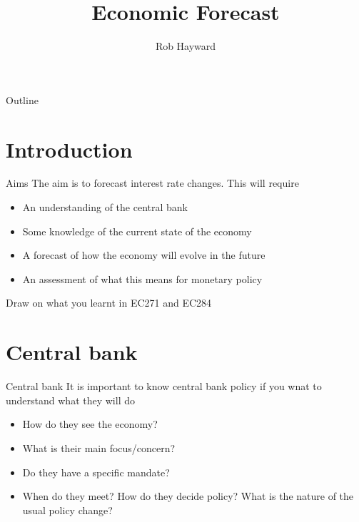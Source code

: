 \documentclass[14pt,xcolor=pdftex,dvipsnames,table]{beamer}\usepackage[]{graphicx}\usepackage[]{color}
\title{Economic Forecast}
\author{Rob Hayward}
\begin{document}
\begin{frame}
\titlepage
\end{frame}


\begin{frame}{Outline}
\tableofcontents
\end{frame}

\section{Introduction}
\begin{frame}{Aims}
The aim is to forecast interest rate changes. This will require
\pause
\begin{itemize}[<+-| alert@+>]
\item An understanding of the central bank
\item Some knowledge of the current state of the economy
\item A forecast of how the economy will evolve in the future
\item An assessment of what this means for monetary policy
\end{itemize}
\pause
Draw on what you learnt in EC271 and EC284
\end{frame}


\section{Central bank}
\begin{frame}{Central bank}
It is important to know central bank policy if you wnat to understand what they will do
\pause
\begin{itemize}[<+-| alert@+>]
\item How do they see the economy?
\item What is their main focus/concern?
\item Do they have a specific mandate? 
\item When do they meet?  How do they decide policy?  What is the nature of the usual policy change? 
\end{itemize}
\end{frame}
\end{document}
